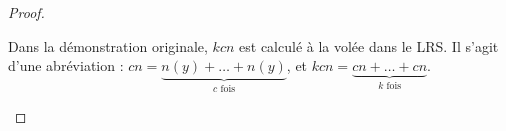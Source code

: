 \begin{appendices}
\begin{proof}
			
			
			\begin{remark}
				Dans la démonstration originale, $kcn$ est calculé à la volée dans le LRS. Il s'agit d'une abréviation : $cn = \underset{c \text{ fois}}{\underbrace{n(y) + \dots + n(y)}}$, et $kcn = \underset{k \text{ fois}}{\underbrace{cn + \dots + cn}}$. 
				

\end{remark}
\end{proof}
\end{appendices}
